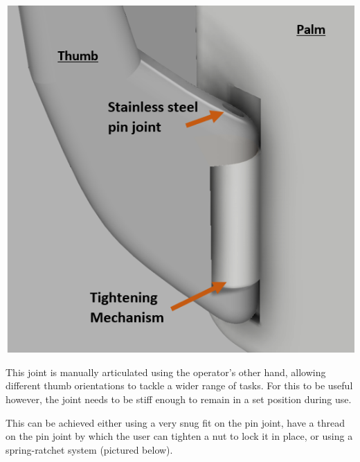 \documentclass[11pt,3p]{report}
\begin{document}
\begin{multicols}{2}
\begin{enumerate}[noitemsep]
{				\includegraphics[scale=0.48]{man_thumb.PNG}
				
				This joint is manually articulated using the operator's other hand, allowing different thumb orientations to tackle a wider range of tasks. For this to be useful however, the joint needs to be stiff enough to remain in a set position during use. 
				
				This can be achieved either using a very snug fit on the pin joint, have a thread on the pin joint by which the user can tighten a nut to lock it in place, or using a spring-ratchet system (pictured below). 
				
}
\end{enumerate}
\end{multicols}
\end{document}
